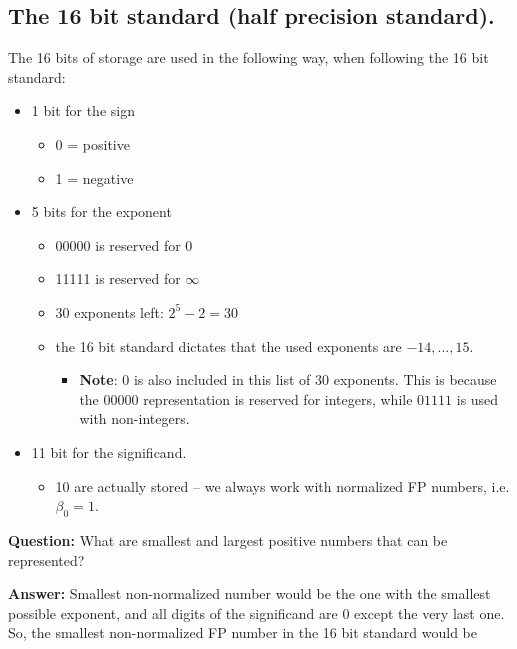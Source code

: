 \documentclass[]{book}
\providecommand{\tightlist}{%
  \setlength{\itemsep}{0pt}\setlength{\parskip}{0pt}}
\theoremstyle{definition}
\theoremstyle{definition}
\theoremstyle{definition}
\theoremstyle{remark}
\begin{document}
\subsection{The 16 bit standard (half precision
standard).}\label{the-16-bit-standard-half-precision-standard.}

The 16 bits of storage are used in the following way, when following the
16 bit standard:

\begin{itemize}
\tightlist
\item
  1 bit for the sign

  \begin{itemize}
  \tightlist
  \item
    0 = positive
  \item
    1 = negative
  \end{itemize}
\item
  5 bits for the exponent

  \begin{itemize}
  \tightlist
  \item
    00000 is reserved for 0
  \item
    11111 is reserved for \(\infty\)
  \item
    30 exponents left: \(2^5 - 2 = 30\)
  \item
    the 16 bit standard dictates that the used exponents are
    \(-14,...,15\).

    \begin{itemize}
    \tightlist
    \item
      \textbf{Note}: \(0\) is also included in this list of 30
      exponents. This is because the \(00000\) representation is
      reserved for integers, while \(01111\) is used with non-integers.
    \end{itemize}
  \end{itemize}
\item
  11 bit for the significand.

  \begin{itemize}
  \tightlist
  \item
    10 are actually stored -- we always work with normalized FP numbers,
    i.e. \(\beta_0 = 1\).
  \end{itemize}
\end{itemize}

\textbf{Question:} What are smallest and largest positive numbers that
can be represented?

\textbf{Answer:} Smallest non-normalized number would be the one with
the smallest possible exponent, and all digits of the significand are 0
except the very last one. So, the smallest non-normalized FP number in
the 16 bit standard would be
\end{document}
